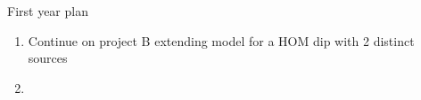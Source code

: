\documentclass{article}
\begin{document}
\maketitle

First year plan
\begin{enumerate}
	\item Continue on project B extending model for a HOM dip with 2 distinct sources 
	\item 
\end{enumerate}
\end{document}

